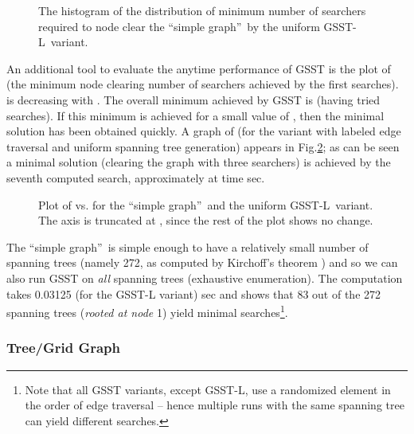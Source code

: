 \documentclass[11pt]{article}\usepackage{amsmath}
\begin{document}
\begin{figure}[h]
\centering{}\caption{The
histogram of the distribution of minimum number of searchers required to node
clear the \textquotedblleft simple graph\textquotedblright\ by the uniform
GSST-L\ variant.}\label{fig03}\end{figure}

An additional tool to evaluate the anytime performance of GSST is the plot of
 (the minimum node clearing number of searchers achieved by the first 
searches).  is decreasing with . The overall minimum
achieved by GSST is  (having tried  searches). If this
minimum is achieved for a small value of , then the minimal solution has
been obtained quickly. A graph of  (for the variant with
labeled edge traversal and uniform spanning tree generation) appears in
Fig.\ref{fig04}; as can be seen a minimal solution (clearing the graph with
three searchers) is achieved by the seventh computed search, approximately at
time sec.

\begin{figure}[h]
\centering
{}\caption{Plot of  vs.  for the \textquotedblleft simple graph\textquotedblright \ and the uniform GSST-L\ variant. The  axis is truncated at , since
the rest of the plot shows no change.}\label{fig04}\end{figure}

The \textquotedblleft simple graph\textquotedblright\ is simple enough to have
a relatively small number of spanning trees (namely 272, as computed by
Kirchoff's theorem \cite{HarrisKirchoff} ) and so we can also run GSST on
\emph{all }spanning trees (exhaustive enumeration). The computation takes
0.03125 (for the GSST-L variant) sec and shows that 83 out of the 272 spanning
trees (\emph{rooted at node} 1) yield minimal searches\footnote{Note that all
GSST variants, except GSST-L, use a randomized element in the order of edge
traversal -- hence multiple runs with the same spanning tree can yield
different searches.}.

\subsubsection{Tree/Grid Graph}
\end{document}
